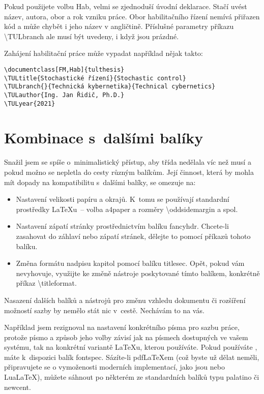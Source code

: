 \documentclass[FM,DP,fonts]{tulthesis}
\makeatletter
\newcommand{\argument}[1]{{\ttfamily\color{\tulcolor}#1}}
\newcommand{\argumentindex}[1]{\argument{#1}\index{#1}}
\newcommand{\prikazneindex}[1]{\argument{\textbackslash #1}}
\newcommand{\prikaz}[1]{\prikazneindex{#1}\index{#1@\textbackslash #1}}
\newenvironment{myquote}{\begin{list}{}{\setlength\leftmargin\parindent}\item[]}{\end{list}}
\newenvironment{listing}{\begin{myquote}\color{\tulcolor}}{\end{myquote}}
\makeatother
\begin{document}
Pokud použijete volbu \argumentindex{Hab}, velmi se zjednoduší úvodní
deklarace. Stačí uvést název, autora, obor a rok vzniku práce. Obor
habilitačního řízení nemívá přiřazen kód a může chybět i jeho název v
angličtině. Příslušné parametry příkazu \prikaz{TULbranch} ale musí být
uvedeny, i když jsou prázdné.

Zahájení habilitační práce může vypadat například nějak takto:

\begin{listing}
\begin{verbatim}
\documentclass[FM,Hab]{tulthesis}
\TULtitle{Stochastické řízení}{Stochastic control}
\TULbranch{}{Technická kybernetika}{Technical cybernetics}
\TULauthor{Ing. Jan Řidič, Ph.D.}
\TULyear{2021}
\end{verbatim}
\end{listing}


\section{Kombinace s~dalšími balíky}

Snažil jsem se spíše o~minimalistický přístup, aby třída nedělala víc než musí
a pokud možno se nepletla do cesty různým balíkům. Její činnost, která by
mohla mít dopady na kompatibilitu s~dalšími balíky, se omezuje na:

\begin{itemize}
\item Nastavení velikosti papíru a okrajů. K~tomu se používají standardní
prostředky \LaTeX u~-- volba \argument{a4paper} a rozměry
\prikazneindex{oddsidemargin} a spol.

\item Nastavení zápatí stránky prostřednictvím balíku \argument{fancyhdr}.
Chcete-li zasahovat do záhlaví nebo zápatí stránek, dělejte to pomocí příkazů
tohoto balíku.

\item Změna formátu nadpisu kapitol pomocí balíku \argument{titlesec}. Opět,
pokud vám nevyhovuje, využijte ke změně nástroje poskytované tímto balíkem,
konkrétně příkaz \prikazneindex{titleformat}.

\end{itemize}

Nasazení dalších balíků a nástrojů pro změnu vzhledu dokumentu či rozšíření
možností sazby by nemělo stát nic v~cestě. Nechávám to na vás.

Například jsem rezignoval na nastavení konkrétního písma pro sazbu práce,
protože písmo a způsob jeho volby závisí jak na písmech dostupných ve vašem
systému, tak na konkrétní variantě \LaTeX u, kterou používáte. Pokud používáte
\XeLaTeX, máte k~dispozici balík \argument{fontspec}. Sázíte-li pdf\-\LaTeX\-em
(což byste už dělat neměli, připravujete se o vymoženosti moderních
implementací, jako jsou \XeLaTeX nebo Lua\LaTeX), můžete sáhnout po některém ze
standardních balíků typu \argument{palatino} či \argument{newcent}.
\end{document}
